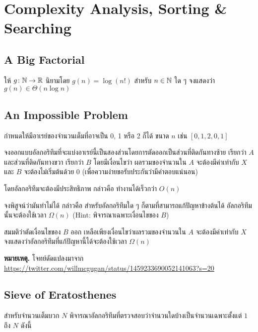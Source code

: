 \chapter{Complexity Analysis, Sorting \& Searching}

\section{A Big Factorial}

\begin{exercise}
ให้ $g \colon \mathbb{N} \to \mathbb{R}$ นิยามโดย $g(n) = \log(n!)$ สำหรับ $n \in \mathbb{N}$ ใด ๆ จงแสดงว่า $g(n) \in \Theta(n \log n)$
\end{exercise}

\section{An Impossible Problem}
\label{twitter:willmcgugan1}
กำหนดให้มีอาเรย์ของจำนวนเต็มที่อาจเป็น 0, 1 หรือ 2 ก็ได้ ขนาด $n$ เช่น $[0, 1, 2, 0, 1]$

จงออกแบบอัลกอริทึมที่จะแบ่งอาเรย์นี้เป็นสองส่วนโดยการตัดออกเป็นส่วนที่ติดกันทางซ้าย เรียกว่า $A$ และส่วนที่ติดกันทางขวา เรียกว่า $B$ โดยมีเงื่อนไขว่า ผลรวมของจำนวนใน $A$ จะต้องมีค่าเท่ากับ $X$ และ $B$ จะต้องไม่เริ่มต้นด้วย $0$ (เพื่อความง่ายขอรับประกันว่ามีคำตอบแน่นอน)

โดยอัลกอริทึมจะต้องมีประสิทธิภาพ กล่าวคือ ทำงานได้เร็วกว่า $O(n)$

\begin{exercise}
จงพิสูจน์ว่ามันทำไม่ได้ กล่าวคือ สำหรับอัลกอริทึมใด ๆ ก็ตามที่สามารถแก้ปัญหาข้างต้นได้ อัลกอริทึมนั้นจะต้องใช้เวลา $\Omega(n)$ (Hint: พิจารณาเฉพาะเงื่อนไขของ $B$)
\end{exercise}

\begin{exercise}
สมมติว่าตัดเงื่อนไขของ $B$ ออก เหลือเพียงเงื่อนไขว่าผลรวมของจำนวนใน $A$ จะต้องมีค่าเท่ากับ $X$ จงแสดงว่าอัลกอริทึมที่แก้ปัญหานี้ได้จะต้องใช้เวลา $\Omega(n)$
\end{exercise}

\noindent \textbf{หมายเหตุ.} โจทย์ดัดแปลงมาจาก \\ \url{https://twitter.com/willmcgugan/status/1459233690052141063?s=20}

\section{Sieve of Eratosthenes}

สำหรับจำนวนเต็มบวก $N$ พิจารณาอัลกอริทึมที่ตรวจสอบว่าจำนวนใดบ้างเป็นจำนวนเฉพาะตั้งแต่ $1$ ถึง $N$ ดังนี้

